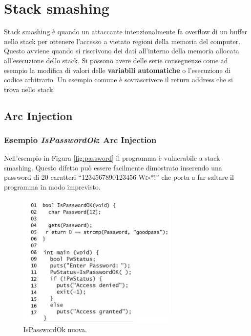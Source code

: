\section{Stack smashing}
Stack smashing è quando un attaccante intenzionalmente fa overflow di un buffer nello stack per ottenere l'accesso a vietato regioni della memoria del computer. Questo avviene quando si riscrivono dei dati all'interno della memoria allocata all'esecuzione dello stack. Si possono avere delle serie conseguenze come ad esempio la modifica di valori delle \textbf{variabili automatiche} o l'esecuzione di codice arbitrario. Un esempio comune è sovrascrivere il return address che si trova nello stack.

\subsection{Arc Injection}
\subsubsection{Esempio \textit{IsPasswordOk}: Arc Injection} Nell'esempio in Figura \ref{fig:password} il programma è vulnerabile a stack smashing. Questo difetto può essere facilmente dimostrato inserendo una password di 20 caratteri  “1234567890123456 W$\triangleright$*!” che porta a far saltare il programma in modo imprevisto.
\begin{figure}[H]
	\centering
    \includegraphics[width=8cm, keepaspectratio]{santini/img/cap_2/pass_ok_new.png}
	\caption{IsPasswordOk nuova.}\label{fig:pass_ok_new}
\end{figure}

